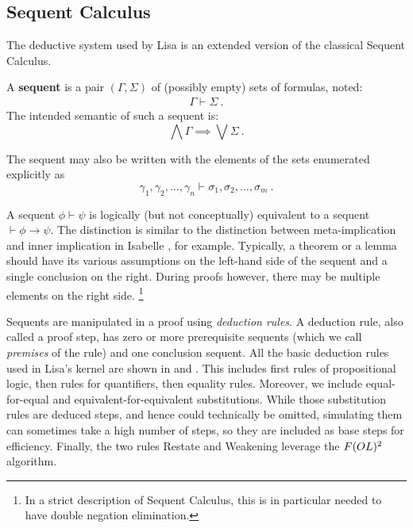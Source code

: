 \subsection{Sequent Calculus}
\label{subsec:lk}
The deductive system used by Lisa is an extended version of the classical Sequent Calculus.
%
\begin{definition}
  A \textbf{sequent} is a pair $(\Gamma, \Sigma)$ of (possibly empty) sets of formulas, noted:
  \begin{gather*}
    \Gamma \vdash \Sigma~.
  \end{gather*}
  The intended semantic of such a sequent is:
  \begin{equation*}
    \label{eq:SequentSemantic}
    \bigwedge \Gamma \implies \bigvee \Sigma~.
  \end{equation*}

  The sequent may also be written with the elements of the sets enumerated explicitly as
  \begin{equation*}
    \gamma_1, \gamma_2, \ldots, \gamma_n \vdash \sigma_1, \sigma_2, \ldots, \sigma_m~.
  \end{equation*}
\end{definition}
A sequent $\phi \vdash \psi$ is logically (but not conceptually) equivalent to a sequent $\vdash \phi \rightarrow \psi$. The distinction is similar to the distinction between meta-implication and inner implication in Isabelle \cite{paulsonIsabelleNext7001993}, for example. Typically, a theorem or a lemma should have its various assumptions on the left-hand side of the sequent and a single conclusion on the right. During proofs however, there may be multiple elements on the right side. \footnote{In a strict description of Sequent Calculus, this is in particular needed to have double negation elimination.}

Sequents are manipulated in a proof using \emph{deduction rules}. A deduction rule, also called a proof step, has zero or more prerequisite sequents (which we call \emph{premises} of the rule) and one conclusion sequent. All the basic deduction rules used in Lisa's kernel are shown in  and .
This includes first rules of propositional logic, then rules for quantifiers, then equality rules. Moreover, we include equal-for-equal and equivalent-for-equivalent substitutions. While those substitution rules are deduced steps, and hence could technically be omitted, simulating them can sometimes take a high number of steps, so they are included as base steps for efficiency.
Finally, the two rules Restate and Weakening leverage the $F(OL)\textsuperscript{2}$ algorithm.


